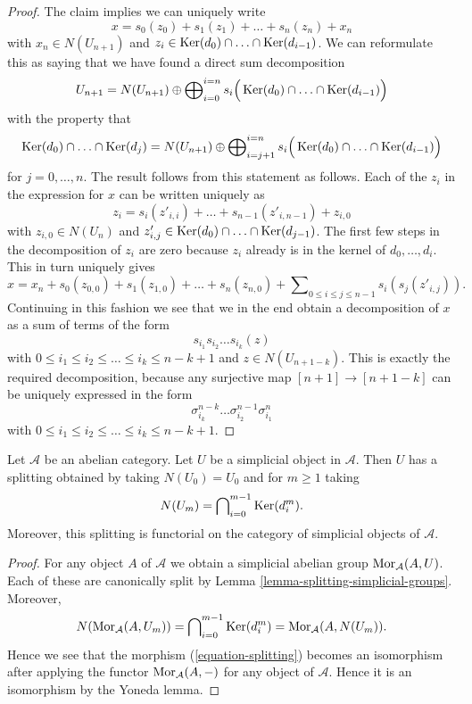 \begin{proof}
\medskip\noindent
The claim implies we can uniquely write
$$
x = s_0(z_0) + s_1(z_1) + \ldots + s_n(z_n) + x_n
$$
with $x_n \in N(U_{n + 1})$ and
$z_i \in \mathop{\mathrm{Ker}}(d_0) \cap \ldots \cap \mathop{\mathrm{Ker}}(d_{i - 1})$.
We can reformulate this as saying that we have found a direct
sum decomposition
$$
U_{n + 1}
=
N(U_{n + 1})
\oplus
\bigoplus\nolimits_{i = 0}^{i = n}
s_i\Big(\mathop{\mathrm{Ker}}(d_0) \cap \ldots \cap \mathop{\mathrm{Ker}}(d_{i - 1})\Big)
$$
with the property that
$$
\mathop{\mathrm{Ker}}(d_0) \cap \ldots \cap \mathop{\mathrm{Ker}}(d_j)
=
N(U_{n + 1}) \oplus
\bigoplus\nolimits_{i = j + 1}^{i = n}
s_i\Big(\mathop{\mathrm{Ker}}(d_0) \cap \ldots \cap \mathop{\mathrm{Ker}}(d_{i - 1})\Big)
$$
for $j = 0, \ldots, n$.
The result follows from this statement as follows.
Each of the $z_i$ in the expression for $x$
can be written uniquely as
$$
z_i = s_i(z'_{i, i}) + \ldots + s_{n - 1}(z'_{i, n - 1}) + z_{i, 0}
$$
with $z_{i, 0} \in N(U_n)$ and
$z'_{i, j} \in \mathop{\mathrm{Ker}}(d_0) \cap \ldots \cap \mathop{\mathrm{Ker}}(d_{j - 1})$.
The first few steps in the decomposition of $z_i$ are zero because
$z_i$ already is in the kernel of $d_0, \ldots, d_i$.
This in turn uniquely gives
$$
x = x_n + s_0(z_{0, 0}) + s_1(z_{1, 0}) + \ldots + s_n(z_{n, 0}) +
\sum\nolimits_{0 \leq i \leq j \leq n - 1} s_i(s_j(z'_{i, j})).
$$
Continuing in this fashion we see that we in the end obtain
a decomposition of $x$ as a sum of terms
of the form
$$
s_{i_1} s_{i_2} \ldots s_{i_k} (z)
$$
with $0 \leq i_1 \leq i_2 \leq \ldots \leq i_k \leq n - k + 1$ and
$z \in N(U_{n + 1 - k})$. This is exactly the required
decomposition, because any surjective map $[n + 1] \to [n + 1 - k]$
can be uniquely expressed in the form
$$
\sigma^{n - k}_{i_k} \ldots \sigma^{n - 1}_{i_2} \sigma^n_{i_1}
$$
with $0 \leq i_1 \leq i_2 \leq \ldots \leq i_k \leq n - k + 1$.
\end{proof}

\begin{lemma}
\label{lemma-splitting-abelian-category}
Let $\mathcal{A}$ be an abelian category.
Let $U$ be a simplicial object in $\mathcal{A}$.
Then $U$ has a splitting obtained by taking $N(U_0) = U_0$ and
for $m \geq 1$ taking
$$
N(U_m) = \bigcap\nolimits_{i = 0}^{m - 1} \mathop{\mathrm{Ker}}(d^m_i).
$$
Moreover, this splitting is functorial on the category of
simplicial objects of $\mathcal{A}$.
\end{lemma}

\begin{proof}
For any object $A$ of $\mathcal{A}$ we obtain
a simplicial abelian group $\mathop{\mathrm{Mor}}\nolimits_\mathcal{A}(A, U)$.
Each of these are canonically split by Lemma
\ref{lemma-splitting-simplicial-groups}. Moreover,
$$
N(\mathop{\mathrm{Mor}}\nolimits_\mathcal{A}(A, U_m)) =
\bigcap\nolimits_{i = 0}^{m - 1} \mathop{\mathrm{Ker}}(d^m_i) =
\mathop{\mathrm{Mor}}\nolimits_\mathcal{A}(A, N(U_m)).
$$
Hence we see that the morphism (\ref{equation-splitting})
becomes an isomorphism after applying the functor
$\mathop{\mathrm{Mor}}\nolimits_\mathcal{A}(A, -)$ for any object of $\mathcal{A}$.
Hence it is an isomorphism by the Yoneda lemma.
\end{proof}

